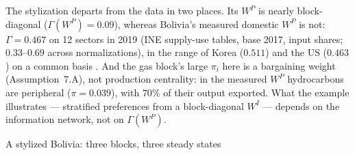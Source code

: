 \documentclass[../structural_economics_book.tex]{subfiles}
\begin{document}
\begin{example}
The stylization departs from the data in two places. Its $W^P$ is nearly block-diagonal ($\Gamma(W^P) = 0.09$), whereas Bolivia's measured domestic $W^P$ is not: $\Gamma = 0.467$ on 12 sectors in 2019 (INE supply-use tables, base 2017, input shares; $0.33$--$0.69$ across normalizations), in the range of Korea ($0.511$) and the US ($0.463$) on a common basis \citep{ine2026sut,oecd2023icio}. And the gas block's large $\pi_i$ here is a bargaining weight (Assumption~7.A), not production centrality: in the measured $W^P$ hydrocarbons are peripheral ($\pi = 0.039$), with $70\%$ of their output exported. What the example illustrates --- stratified preferences from a block-diagonal $W^I$ --- depends on the information network, not on $\Gamma(W^P)$.
\end{example}

\begin{vizpanel}{A stylized Bolivia: three blocks, three steady states}
\begin{center}
\end{center}
\end{vizpanel}
\end{document}
